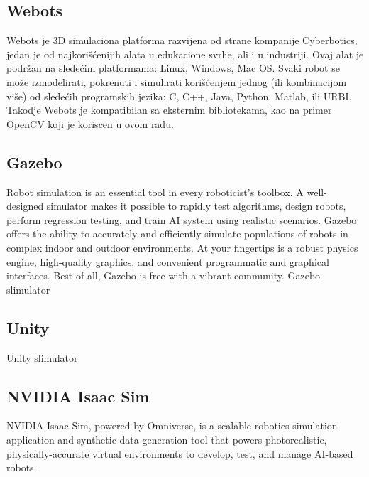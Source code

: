 \subsection{Webots}
Webots je 3D simulaciona platforma razvijena od strane kompanije Cyberbotics, 
jedan je od najkorišćenijih alata u edukacione svrhe, ali i u industriji.
Ovaj alat je podržan na sledećim platformama: Linux, Windows, Mac OS.
Svaki robot se može izmodelirati, pokrenuti i simulirati korišćenjem jednog
(ili kombinacijom više) od sledećih programskih jezika: C, C++, Java, Python, Matlab, ili URBI.
Takodje Webots je kompatibilan sa eksternim bibliotekama, kao na primer OpenCV koji je
koriscen u ovom radu.

\subsection{Gazebo}
Robot simulation is an essential tool in every roboticist's toolbox. A well-designed
simulator makes it possible to rapidly test algorithms, design robots, perform regression
testing, and train AI system using realistic scenarios. Gazebo offers the ability to
accurately and efficiently simulate populations of robots in complex indoor and outdoor environments. At your fingertips is a robust physics engine, high-quality graphics, and convenient programmatic and graphical interfaces. Best of all, Gazebo is free with a vibrant community.
Gazebo slimulator

\subsection{Unity}

Unity slimulator

\subsection{NVIDIA Isaac Sim}
NVIDIA Isaac Sim, powered by Omniverse, is a scalable robotics simulation
application and synthetic data generation tool that powers photorealistic,
physically-accurate virtual environments to develop, test,
and manage AI-based robots.
